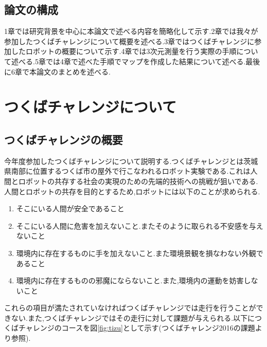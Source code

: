\documentclass[12pt,oneside]{sotsuken_paper}
\begin{document}
\section{論文の構成}
1章では研究背景を中心に本論文で述べる内容を簡略化して示す.2章では我々が参加したつくばチャレンジについて概要を述べる.3章ではつくばチャレンジに参加したロボットの概要について示す.4章では3次元測量を行う実際の手順について述べる.5章では4章で述べた手順でマップを作成した結果について述べる.最後に6章で本論文のまとめを述べる.
\chapter{つくばチャレンジについて} 
\section{つくばチャレンジの概要} 
今年度参加したつくばチャレンジについて説明する.つくばチャレンジとは茨城県南部に位置するつくば市の屋外で行こなわれるロボット実験である.これは人間とロボットの共存する社会の実現のための先端的技術への挑戦が狙いである.人間とロボットの共存を目的とするため,ロボットには以下のことが求められる. 
\begin{enumerate} 
 \item そこにいる人間が安全であること 
\item そこにいる人間に危害を加えないこと.またそのように取られる不安感を与えないこと 
 \item 環境内に存在するものに手を加えないこと.また環境景観を損なわない外観であること 
\item 環境内に存在するものの邪魔にならないこと.また,環境内の運動を妨害しないこと 
\end{enumerate} 
これらの項目が満たされていなければつくばチャレンジでは走行を行うことができない.また,つくばチャレンジではその走行に対して課題が与えられる.以下につくばチャレンジのコースを図\ref{fig:tizu}として示す(つくばチャレンジ2016の課題より参照). 
\end{document}
